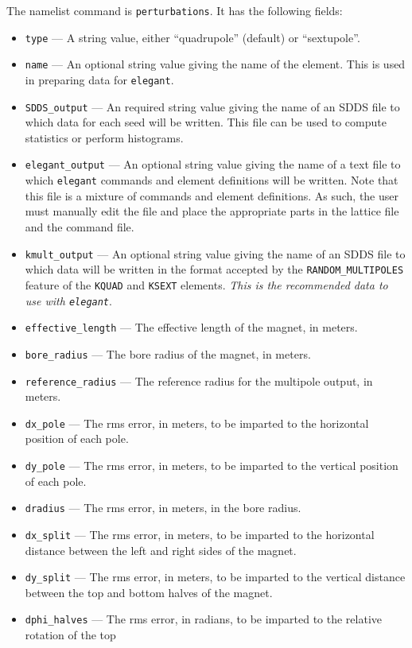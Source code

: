 \documentclass[11pt]{article}
\begin{document}
\begin{itemize}
The namelist command is {\tt perturbations}.  It has the following fields:
\begin{itemize}
\item {\tt type} --- A string value, either ``quadrupole'' (default) or ``sextupole''.
\item {\tt name} --- An optional string value giving the name of the element.  This is
  used in preparing data for {\tt elegant}.
\item {\tt SDDS\_output} --- An required string value giving the name of an SDDS file to which
  data for each seed will be written.  This file can be used to compute statistics or perform
  histograms.
\item {\tt elegant\_output} --- An optional string value giving the name of a text file to which
  {\tt elegant} commands and element definitions will be written.  Note that this file is a mixture
  of commands and element definitions.  As such, the user must manually edit the file and place the
  appropriate parts in the lattice file and the command file.
\item {\tt kmult\_output} --- An optional string value giving the name of an SDDS file to which
  data will be written in the format accepted by the {\tt RANDOM\_MULTIPOLES} feature of the {\tt KQUAD}
  and {\tt KSEXT} elements.  {\em This is the recommended data to use with {\tt elegant}}.
\item {\tt effective\_length} --- The effective length of the magnet, in meters.
\item {\tt bore\_radius} --- The bore radius of the magnet, in meters.
\item {\tt reference\_radius} --- The reference radius for the multipole output, in meters.
\item {\tt dx\_pole} --- The rms error, in meters, to be imparted to the horizontal position of each pole.
\item {\tt dy\_pole} --- The rms error, in meters, to be imparted to the vertical position of each pole.
\item {\tt dradius} --- The rms error, in meters, in the bore radius.
\item {\tt dx\_split} --- The rms error, in meters, to be imparted to the horizontal distance between the
  left and right sides of the magnet.
\item {\tt dy\_split} --- The rms error, in meters, to be imparted to the vertical distance between the
  top and bottom halves of the magnet.
\item {\tt dphi\_halves} --- The rms error, in radians, to be imparted to the relative rotation of the top

\end{itemize}
\end{itemize}
\end{document}

